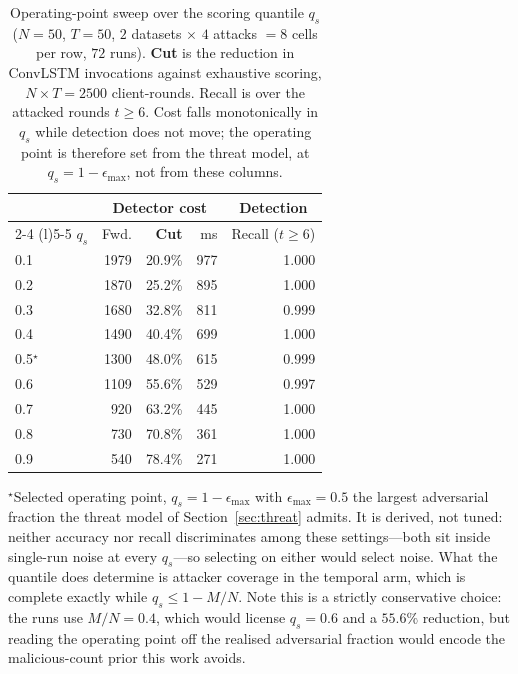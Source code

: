 \documentclass[journal]{IEEEtran}
\begin{document}
\begin{table}[!t]
\centering
\caption{Operating-point sweep over the scoring quantile $q_s$ ($N=50$, $T=50$, $2$ datasets $\times$ $4$ attacks $=8$ cells per row, $72$ runs). \textbf{Cut} is the reduction in ConvLSTM invocations against exhaustive scoring, $N \times T = 2500$ client-rounds. Recall is over the attacked rounds $t \ge 6$. Cost falls monotonically in $q_s$ while detection does not move; the operating point is therefore set from the threat model, at $q_s=1-\epsilon_{\max}$, not from these columns.}
\label{tab:invocation_cost}
\footnotesize
\setlength{\tabcolsep}{4pt}
\begin{tabular}{@{}lrrrr@{}}
\toprule
 & \multicolumn{3}{c}{\textbf{Detector cost}} & \multicolumn{1}{c}{\textbf{Detection}} \\
\cmidrule(lr){2-4} \cmidrule(l){5-5}
$q_s$ & Fwd. & \textbf{Cut} & ms & Recall ($t\ge6$) \\
\midrule
0.1 & 1979 & 20.9\% & 977 & 1.000 \\
0.2 & 1870 & 25.2\% & 895 & 1.000 \\
0.3 & 1680 & 32.8\% & 811 & 0.999 \\
0.4 & 1490 & 40.4\% & 699 & 1.000 \\
0.5$^\star$ & 1300 & 48.0\% & 615 & 0.999 \\
0.6 & 1109 & 55.6\% & 529 & 0.997 \\
0.7 & 920 & 63.2\% & 445 & 1.000 \\
0.8 & 730 & 70.8\% & 361 & 1.000 \\
0.9 & 540 & 78.4\% & 271 & 1.000 \\
\bottomrule
\end{tabular}

\vspace{2pt}
{\footnotesize \raggedright $^\star$Selected operating point, $q_s=1-\epsilon_{\max}$ with $\epsilon_{\max}=0.5$ the largest adversarial fraction the threat model of Section~\ref{sec:threat} admits. It is derived, not tuned: neither accuracy nor recall discriminates among these settings---both sit inside single-run noise at every $q_s$---so selecting on either would select noise. What the quantile does determine is attacker coverage in the temporal arm, which is complete exactly while $q_s\le1-M/N$. Note this is a strictly conservative choice: the runs use $M/N=0.4$, which would license $q_s=0.6$ and a $55.6\%$ reduction, but reading the operating point off the realised adversarial fraction would encode the malicious-count prior this work avoids.\par}
\end{table}
\end{document}

